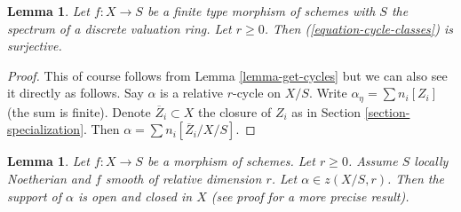 \documentclass{stacks-project}
\theoremstyle{plain}
\newtheorem{lemma}[subsection]{Lemma}
\theoremstyle{definition}
\theoremstyle{remark}
\numberwithin{equation}{subsection}
\begin{document}
\begin{lemma}
\label{lemma-get-cycles-dvr}
Let $f : X \to S$ be a finite type morphism of schemes with $S$
the spectrum of a discrete valuation ring. Let $r \geq 0$.
Then (\ref{equation-cycle-classes}) is surjective.
\end{lemma}

\begin{proof}
This of course follows from Lemma \ref{lemma-get-cycles} but we can
also see it directly as follows. Say $\alpha$ is a relative $r$-cycle
on $X/S$. Write $\alpha_\eta = \sum n_i[Z_i]$ (the sum is finite). Denote
$\overline{Z}_i \subset X$ the closure of $Z_i$ as in
Section \ref{section-specialization}. Then
$\alpha = \sum n_i[\overline{Z}_i/X/S]$.
\end{proof}

\begin{lemma}
\label{lemma-relative-cycle-smooth}
Let $f : X \to S$ be a morphism of schemes. Let $r \geq 0$. Assume $S$
locally Noetherian and $f$ smooth of relative dimension $r$. Let
$\alpha \in z(X/S, r)$. Then the support of $\alpha$ is open and closed in $X$
(see proof for a more precise result).
\end{lemma}
\end{document}
